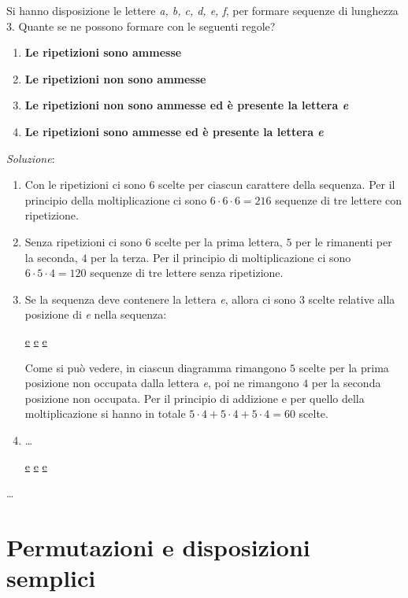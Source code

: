 \begin{ese}
	Si hanno disposizione le lettere \emph{a, b, c, d, e, f}, per formare sequenze di lunghezza 3.
	Quante se ne possono formare con le seguenti regole?
	\begin{enumerate}
		\item \textbf{Le ripetizioni sono ammesse}
		\item \textbf{Le ripetizioni non sono ammesse}
		\item \textbf{Le ripetizioni non sono ammesse ed è presente la lettera \emph{e}}
		\item \textbf{Le ripetizioni sono ammesse ed è presente la lettera \emph{e}}
	\end{enumerate}
	\emph{Soluzione}:
	\begin{enumerate}
		\item Con le ripetizioni ci sono $6$ scelte per ciascun carattere della sequenza. 
		Per il principio della moltiplicazione ci sono $6 \cdot 6 \cdot  6 = 216$ sequenze di
		tre lettere con ripetizione.
		\item Senza ripetizioni ci sono $6$ scelte per la prima lettera, $5$ per le rimanenti
		per la seconda, $4$ per la terza. Per il principio di moltiplicazione ci sono 
		$6 \cdot 5 \cdot 4 = 120$ sequenze di tre lettere senza ripetizione.
		\item Se la sequenza deve contenere la lettera \emph{e}, allora ci sono 3 scelte relative
		alla posizione di \emph{e} nella sequenza:
		\begin{center}
			\centering
			\underline{e} \underline{ } \underline{ }
			\quad
			\underline{ } \underline{e} \underline{ }
			\quad
			\underline{ } \underline{ } \underline{e}
		\end{center}
		Come si può vedere, in ciascun diagramma rimangono $5$ scelte per la prima posizione non
		occupata dalla lettera \emph{e}, poi ne rimangono $4$ per la seconda posizione non occupata.
		Per il principio di addizione e per quello della moltiplicazione si hanno in totale 
		$ 5 \cdot 4 +  5 \cdot 4 +  5 \cdot 4 = 60$ scelte.
		\item \dots
		\begin{center}
			\centering
			\underline{e} \underline{ } \underline{ }
			\quad
			\underline{} \underline{e} \underline{ }
			\quad
			\underline{} \underline{} \underline{e}
		\end{center}
	\end{enumerate}
	\dots
	\QEDA
\end{ese}
\section{Permutazioni e disposizioni semplici}